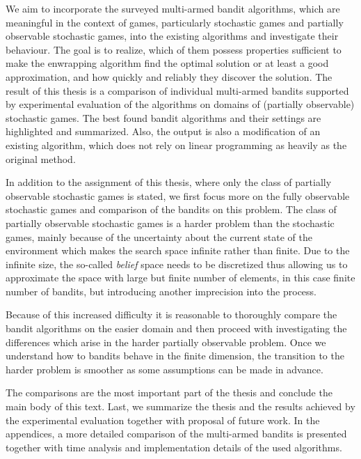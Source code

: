 \documentclass[../main.tex]{subfiles}
\begin{document}
We aim to incorporate the surveyed multi-armed bandit algorithms, which are meaningful in the context of games, particularly stochastic games and partially observable stochastic games, into the existing algorithms and investigate their behaviour.
The goal is to realize, which of them possess properties sufficient to make the enwrapping algorithm find the optimal solution or at least a good approximation, and how quickly and reliably they discover the solution.
The result of this thesis is a comparison of individual multi-armed bandits supported by experimental evaluation of the algorithms on domains of (partially observable) stochastic games.
The best found bandit algorithms and their settings are highlighted and summarized.
Also, the output is also a modification of an existing algorithm, which does not rely on linear programming as heavily as the original method.

In addition to the assignment of this thesis, where only the class of partially observable stochastic games is stated, we first focus more on the fully observable stochastic games and comparison of the bandits on this problem.
The class of partially observable stochastic games is a harder problem than the stochastic games, mainly because of the uncertainty about the current state of the environment which makes the search space infinite rather than finite.
Due to the infinite size, the so-called \textit{belief} space needs to be discretized thus allowing us to approximate the space with large but finite number of elements, in this case finite number of bandits, but introducing another imprecision into the process.

Because of this increased difficulty it is reasonable to thoroughly compare the bandit algorithms on the easier domain and then proceed with investigating the differences which arise in the harder partially observable problem.
Once we understand how to bandits behave in the finite dimension, the transition to the harder problem is smoother as some assumptions can be made in advance.

The comparisons are the most important part of the thesis and conclude the main body of this text.
Last, we summarize the thesis and the results achieved by the experimental evaluation together with proposal of future work.
In the appendices, a more detailed comparison of the multi-armed bandits is presented together with time analysis and implementation details of the used algorithms.
\end{document}
